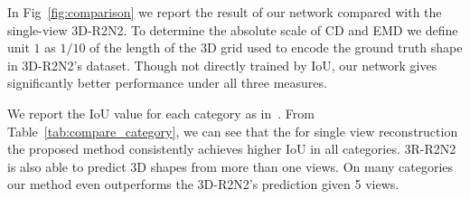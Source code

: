 \documentclass[10pt,twocolumn,letterpaper]{article}
\begin{document}
In Fig~\ref{fig:comparison} we report the result of our network compared with the single-view 3D-R2N2. To determine the absolute scale of CD and EMD we define unit $1$ as $1/10$ of the length of the 3D grid used to encode the ground truth shape in 3D-R2N2's dataset. Though not directly trained by IoU, our network gives significantly better performance under all three measures. 

\begin{table}[t!]
  \caption{3D reconstruction comparison (per category). Notice that in the single view reconstruction setting we achieved higher IoU in all categories. The mean is taken category-wise. For 8 out of 13 categories, our results are even better than 3D-R2N2 given 5 views.}\label{tab:compare_category}
\end{table}

We report the IoU value for each category as in~\cite{choy20163d}. From Table~\ref{tab:compare_category},
we can see that the for single view reconstruction the proposed method consistently achieves higher IoU in all categories. 3R-R2N2 is also able to predict 3D shapes from more than one views. On many categories our method even outperforms the 3D-R2N2's prediction given 5 views.
\end{document}
